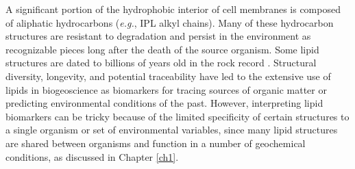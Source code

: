 
A significant portion of the hydrophobic interior of cell membranes is composed of aliphatic hydrocarbons (\textit{e.g.}, IPL alkyl chains). Many of these hydrocarbon structures are resistant to degradation and persist in the environment as recognizable pieces long after the death of the source organism. Some lipid structures are dated to billions of years old in the rock record \citep{brocks2003composition, brocks2003reconstruction}. Structural diversity, longevity, and potential traceability have led to the extensive use of lipids in biogeoscience as biomarkers for tracing sources of organic matter or predicting environmental conditions of the past. However, interpreting lipid biomarkers can be tricky because of the limited specificity of certain structures to a single organism or set of environmental variables, since many lipid structures are shared between organisms and function in a number of geochemical conditions, as discussed in Chapter \ref{ch1}.

